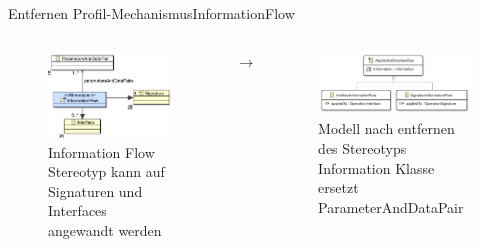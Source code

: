 \documentclass{sdqbeamer}
\begin{document}
\begin{frame}{Entfernen Profil-Mechanismus}{InformationFlow}
	\begin{columns}
		\centering
		\begin{figure}
			\includegraphics[width=\textwidth]{images/repsoitory_stereotype.pdf}
			\caption{Information Flow Stereotyp kann auf Signaturen und Interfaces angewandt werden}
		\end{figure}
		\centering
		$\rightarrow$
		\centering
		\begin{figure}
			\includegraphics[width=\textwidth]{images/repository.pdf}
			\caption{Modell nach entfernen des Stereotyps \linebreak Information Klasse ersetzt ParameterAndDataPair}
		\end{figure}
	\end{columns}
\end{frame}
\end{document}
